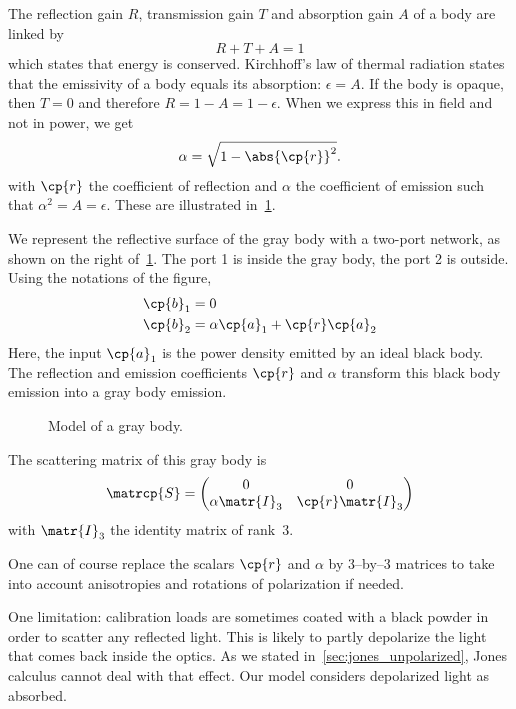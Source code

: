 The reflection gain $R$, transmission gain $T$ and absorption gain $A$ of a body are linked by
\begin{equation}
    R + T + A = 1
\end{equation}
which states that energy is conserved.
Kirchhoff's law of thermal radiation states that the emissivity of a body equals its absorption: $\epsilon = A$.
If the body is opaque, then $T=0$ and therefore $R=1-A=1-\epsilon$.
When we express this in field and not in power, we get
\begin{equation}
    \alpha = \sqrt{ 1 - \abs{\cp{r}}^2 } \text{.}
\end{equation}
with $\cp{r}$ the coefficient of reflection and $\alpha$ the coefficient of emission such that $\alpha^2=A=\epsilon$.
These are illustrated in~\cref{fig:gray_body}.

We represent the reflective surface of the gray body with a two-port network, as shown on the right of~\cref{fig:gray_body}.
The port 1 is inside the gray body, the port 2 is outside.
Using the notations of the figure,
\begin{align}
    \cp{b}_1 &= 0 \\
    \cp{b}_2 &= \alpha \cp{a}_1 + \cp{r} \cp{a}_2
\end{align}
Here, the input $\cp{a}_1$ is the power density emitted by an ideal black body.
The reflection and emission coefficients $\cp{r}$ and $\alpha$ transform this black body emission into a gray body emission.

\begin{figure}[hbtp]
    \centering
    
    \caption{Model of a gray body.}
    \label{fig:gray_body}
\end{figure}

The scattering matrix of this gray body is
\begin{equation}
    \matrcp{S} =
    \begin{pmatrix}
        0 & 0 \\
        \alpha \matr{I}_3 & \cp{r} \matr{I}_3
    \end{pmatrix}
\end{equation}
with $\matr{I}_3$ the identity matrix of rank~3.

One can of course replace the scalars $\cp{r}$ and $\alpha$ by 3--by--3 matrices to take into account anisotropies and rotations of polarization if needed.

One limitation: calibration loads are sometimes coated with a black powder in order to scatter any reflected light.
This is likely to partly depolarize the light that comes back inside the optics.
As we stated in~\cref{sec:jones_unpolarized}, Jones calculus cannot deal with that effect.
Our model considers depolarized light as absorbed.

